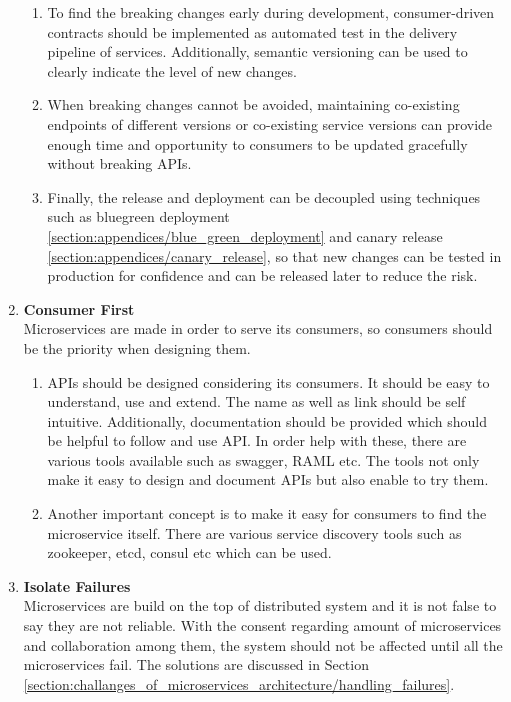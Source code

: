 \begin{enumerate}
\begin{enumerate}
\item To find the breaking changes early during development, consumer-driven contracts should be implemented as automated test in the delivery pipeline of services. Additionally, semantic versioning can be used to clearly indicate the level of new changes.
\item When breaking changes cannot be avoided, maintaining co-existing endpoints of different versions or co-existing service versions can provide enough time and opportunity to consumers to be updated gracefully without breaking \acrshort{API}s.
\item Finally, the release and deployment can be decoupled using techniques such as bluegreen deployment \ref{section:appendices/blue_green_deployment} and canary release \ref{section:appendices/canary_release}, so that new changes can be tested in production for confidence and can be released later to reduce the risk.
\end{enumerate}
\item \textbf{Consumer First}\\
Microservices are made in order to serve its consumers, so consumers should be the priority when designing them.
\begin{enumerate}
\item \acrshort{API}s should be designed considering its consumers. It should be easy to understand, use and extend. The name as well as link should be self intuitive. Additionally, documentation should be provided which should be helpful to follow and use \acrshort{API}. In order help with these, there are various tools available such as swagger, RAML etc. The tools not only make it easy to design and document \acrshort{API}s but also enable to try them.\cite{Bloch:2016aa} \cite{Blanchette:2008aa}
\item Another important concept is to make it easy for consumers to find the microservice itself. There are various service discovery tools such as zookeeper, etcd, consul etc which can be used.
\end{enumerate}
\item \textbf{Isolate Failures}\\
Microservices are build on the top of distributed system and it is not false to say they are not reliable.\cite{Factor:2014aa} With the consent regarding amount of microservices and collaboration among them, the system should not be affected until all the microservices fail. The solutions are discussed in Section \ref{section:challanges_of_microservices_architecture/handling_failures}.

\end{enumerate}
